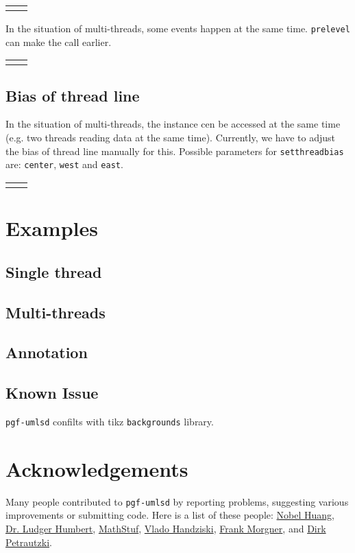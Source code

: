 \documentclass{article}
\newcommand{\demo}[2][1]{
  \begin{center}
  \begin{tabular}{cc}
    \begin{minipage}{.49\linewidth}
      \centering
      \resizebox{#1\linewidth}{!}{
        
      }
    \end{minipage}
    &
    \begin{minipage}{.45\linewidth}
      
    \end{minipage}
  \end{tabular}
  \end{center}
}
\newcommand{\example}[2][1]{
  \begin{center}  
    \resizebox{#1\linewidth}{!}{
      
    }
  \end{center}
  
}
\begin{document}
\demo[0.6]{postlevel}

In the situation of multi-threads, some events happen at the same
time. \texttt{prelevel} can make the call earlier.

\demo[0.6]{prelevel}

\subsection{Bias of thread line}
In the situation of multi-threads, the instance cen be accessed at the
same time (e.g. two threads reading data at the same time). Currently,
we have to adjust the bias of thread line manually for this. Possible
parameters for \texttt{setthreadbias} are: \texttt{center},
\texttt{west} and \texttt{east}.

\demo[0.8]{threadbias}

\section{Examples}
\subsection{Single thread}
\example[0.8]{single-thread-example}

\subsection{Multi-threads}
\example[0.8]{multi-threads-example}

\subsection{Annotation}
\example[0.5]{sync-clock}

\subsection{Known Issue}
\texttt{pgf-umlsd} confilts with tikz \texttt{backgrounds} library.

\section{Acknowledgements}
Many people contributed to \texttt{pgf-umlsd} by reporting problems,
suggesting various improvements or submitting code. Here is a list of
these people:
\href{mailto:nobel1984@gmail.com}{Nobel Huang},
\href{mailto:humbert@uni-wuppertal.de}{Dr. Ludger Humbert},
\href{mailto:MathStuf@gmail.com}{MathStuf},
\href{mailto:vlado.handziski@gmail.com}{Vlado Handziski},
\href{mailto:frankmorgner@gmail.com}{Frank Morgner},
and \href{mailto:petrautzki@hs-coburg.de}{Dirk Petrautzki}.
\end{document}
